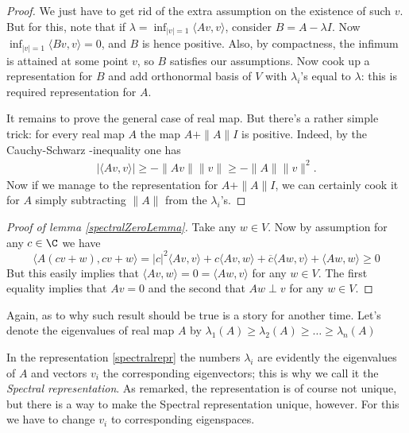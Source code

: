 \begin{proof}
	We just have to get rid of the extra assumption on the existence of such $v$. But for this, note that if $\lambda = \inf_{|v| = 1} \langle A v, v \rangle$, consider $B = A - \lambda I$. Now $\inf_{|v| = 1} \langle B v, v \rangle = 0$, and $B$ is hence positive. Also, by compactness, the infimum is attained at some point $v$, so $B$ satisfies our assumptions. Now cook up a representation for $B$ and add orthonormal basis of $V$ with $\lambda_{i}$'s equal to $\lambda$: this is required representation for $A$.

	It remains to prove the general case of real map. But there's a rather simple trick: for every real map $A$ the map $A + \|A\| I$ is positive. Indeed, by the Cauchy-Schwarz -inequality one has
	\begin{align*}
		\left|\langle A v, v \rangle\right| \geq -\|A v\| \|v\| \geq - \|A\| \|v\|^{2}.
	\end{align*}
	Now if we manage to the representation for $A + \|A\| I$, we can certainly cook it for $A$ simply subtracting $\|A\|$ from the $\lambda_{i}$'s.
\end{proof}

\begin{proof}[Proof of lemma \ref{spectralZeroLemma}]
	Take any $w \in V$. Now by assumption for any $c \in \C$ we have
	\[
		\langle A (c v + w), c v + w \rangle = |c|^{2} \langle A v, v \rangle + c \langle A v, w \rangle + \overline{c} \langle A w, v \rangle + \langle A w, w \rangle \geq 0
	\]
	But this easily implies that $\langle A v, w \rangle = 0 = \langle A w, v \rangle$ for any $w \in V$. The first equality implies that $A v = 0$ and the second that $A w \perp v$ for any $w \in V$.
\end{proof}

Again, as to why such result should be true is a story for another time. Let's denote the eigenvalues of real map $A$ by $\lambda_{1}(A) \geq \lambda_{2}(A) \geq \ldots \geq \lambda_{n}(A)$

In the representation \ref{spectralrepr} the numbers $\lambda_{i}$ are evidently the eigenvalues of $A$ and vectors $v_{i}$ the corresponding eigenvectors; this is why we call it the \textit{Spectral representation}. As remarked, the representation is of course not unique, but there is a way to make the Spectral representation unique, however. For this we have to change $v_{i}$ to corresponding eigenspaces.

